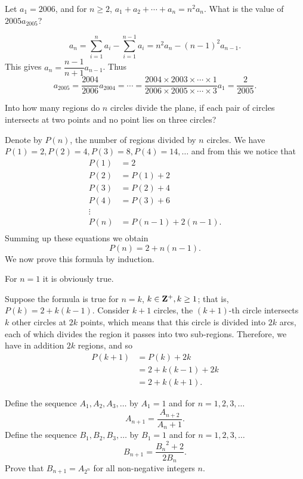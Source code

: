 \begin{prbm}
Let $a_1=2006$, and for $n\ge2$, $a_1+a_2+\cdots+a_n=n^2a_n$. What is the value of $2005a_{2005}$?
\end{prbm}

\begin{solution}
\[ a_n=\sum_{i=1}^na_i-\sum_{i=1}^{n-1}a_i=n^2a_n-(n-1)^2a_{n-1}. \]
This gives $a_n=\dfrac{n-1}{n+1}a_{n-1}$. Thus
\[ a_{2005}=\frac{2004}{2006}a_{2004}=\cdots=\frac{2004\times2003\times\cdots\times1}{2006\times2005\times\cdots\times3}a_1=\frac{2}{2005}. \]
\end{solution}

\begin{prbm}
Into how many regions do $n$ circles divide the plane, if each pair of circles intersects at two points and no point lies on three circles?
\end{prbm}

\begin{solution}
Denote by $P(n)$, the number of regions divided by $n$ circles. We have $P(1)=2,P(2)=4,P(3)=8,P(4)=14,\dots$ and from this we notice that
\begin{align*}
P(1)&=2\\
P(2)&=P(1)+2\\
P(3)&=P(2)+4\\
P(4)&=P(3)+6\\
\vdots&\\
P(n)&=P(n-1)+2(n-1).\\
\end{align*}
Summing up these equations we obtain
\[P(n)=2+n(n-1).\]
We now prove this formula by induction.

For $n=1$ it is obviously true.

Suppose the formula is true for $n=k$, $k\in\mathbf Z^+,k\ge1$; that is, $P(k)=2+k(k-1)$. Consider $k+1$ circles, the $(k+1)$-th circle intersects $k$ other circles at $2k$ points, which means that this circle is divided into $2k$ arcs, each of which divides the region it passes into two sub-regions. Therefore, we have in addition $2k$ regions, and so
\begin{align*}
P(k+1)&=P(k)+2k\\
&=2+k(k-1)+2k\\
&=2+k(k+1).
\end{align*}
\end{solution}

\begin{prbm}
Define the sequence $A_1,A_2,A_3,\dots$ by $A_1=1$ and for $n=1,2,3,\dots$
\[ A_{n+1}=\frac{A_{n+2}}{A_n+1}. \]
Define the sequence $B_1,B_2,B_3,\dots$ by $B_1=1$ and for $n=1,2,3,\dots$
\[ B_{n+1}=\frac{{B_n}^2+2}{2B_n}. \]
Prove that $B_{n+1}=A_{2^n}$ for all non-negative integers $n$.
\end{prbm}

